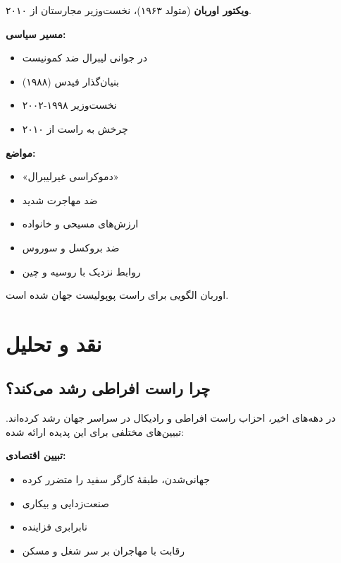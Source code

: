 \begin{tcolorbox}[
    enhanced,
    colback=gray!5,
    colframe=darkgray,
    boxrule=2pt,
    arc=10pt,
    shadow={2mm}{-2mm}{0mm}{black!30},
    fonttitle=\bfseries\large,
    title={\rl{👤 پرترهٔ سیاستمدار: ویکتور اوربان}}
]

\textbf{ویکتور اوربان} (متولد ۱۹۶۳)، نخست‌وزیر مجارستان از ۲۰۱۰.

\textbf{مسیر سیاسی:}
\begin{itemize}
    \item در جوانی لیبرال ضد کمونیست
    \item بنیان‌گذار فیدس (۱۹۸۸)
    \item نخست‌وزیر ۱۹۹۸-۲۰۰۲
    \item چرخش به راست از ۲۰۱۰
\end{itemize}



\textbf{مواضع:}
\begin{itemize}
    \item «دموکراسی غیرلیبرال»
    \item ضد مهاجرت شدید
    \item ارزش‌های مسیحی و خانواده
    \item ضد بروکسل و سوروس
    \item روابط نزدیک با روسیه و چین
\end{itemize}

اوربان الگویی برای راست پوپولیست جهان شده است.

\end{tcolorbox}

\section{نقد و تحلیل}

\subsection{چرا راست افراطی رشد می‌کند؟}


در دهه‌های اخیر، احزاب راست افراطی و رادیکال در سراسر جهان رشد کرده‌اند. تبیین‌های مختلفی برای این پدیده ارائه شده:

\textbf{تبیین اقتصادی:}
\begin{itemize}
    \item جهانی‌شدن، طبقهٔ کارگر سفید را متضرر کرده
    \item صنعت‌زدایی و بیکاری
    \item نابرابری فزاینده
    \item رقابت با مهاجران بر سر شغل و مسکن
\end{itemize}

